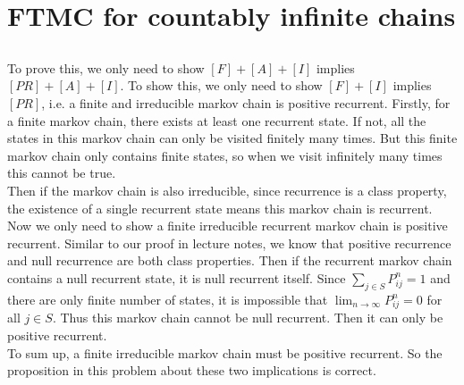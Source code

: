 \documentclass[12pt,letterpaper]{article}
\begin{document}
\section{FTMC for countably infinite chains}

\subsection{}
To prove this, we only need to show $[F]+[A]+[I]$ implies $[PR]+[A]+[I]$.\newline
To show this, we only need to show $[F]+[I]$ implies $[PR]$, i.e.
a finite and irreducible markov chain is positive recurrent.\newline
\newline
Firstly, for a finite markov chain, there exists at least one recurrent state.
If not, all the states in this markov chain can only be visited finitely many times.
But this finite markov chain only contains finite states,
so when we visit infinitely many times this cannot be true.\\
Then if the markov chain is also irreducible, since recurrence is a class property,
the existence of a single recurrent state means this markov chain is recurrent.\\
\newline
Now we only need to show a finite irreducible recurrent markov chain is positive recurrent.
Similar to our proof in lecture notes, we know that positive recurrence and null recurrence are both class properties.
Then if the recurrent markov chain contains a null recurrent state, it is null recurrent itself.
Since $\sum_{j\in S}P_{ij}^{n}=1$ and there are only finite number of states,
it is impossible that $\lim_{n\to\infty}P_{ij}^{n}=0$ for all $j\in S$.
Thus this markov chain cannot be null recurrent. Then it can only be positive recurrent.\\
\newline
To sum up, a finite irreducible markov chain must be positive recurrent.
So the proposition in this problem about these two implications is correct.
\end{document}
